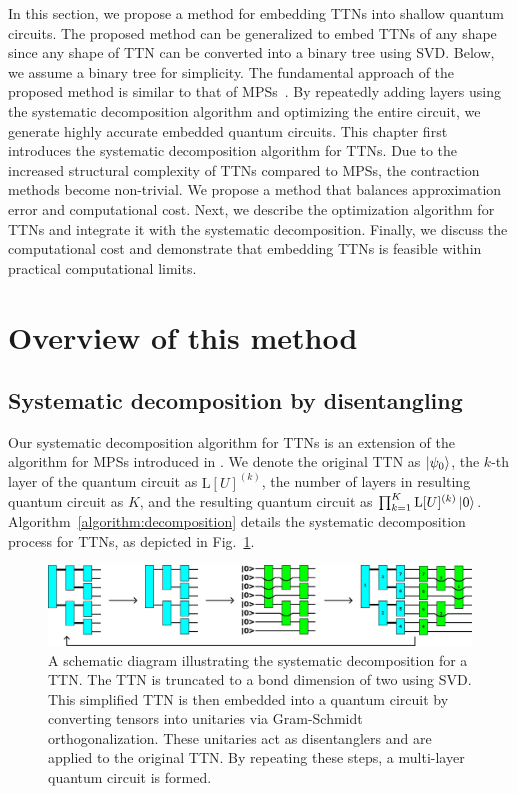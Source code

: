 \documentclass[12pt,dvipdfmx,twoside,openright]{report}
\begin{document}
In this section, we propose a method for embedding TTNs into shallow quantum circuits.
The proposed method can be generalized to embed TTNs of any shape since any shape of TTN can be converted into a binary tree using SVD.
Below, we assume a binary tree for simplicity.
The fundamental approach of the proposed method is similar to that of MPSs~\cite{mpsdecomp}. 
By repeatedly adding layers using the systematic decomposition algorithm and optimizing the entire circuit, we generate highly accurate embedded quantum circuits.
This chapter first introduces the systematic decomposition algorithm for TTNs.
Due to the increased structural complexity of TTNs compared to MPSs, the contraction methods become non-trivial. 
We propose a method that balances approximation error and computational cost.
Next, we describe the optimization algorithm for TTNs and integrate it with the systematic decomposition.
Finally, we discuss the computational cost and demonstrate that embedding TTNs is feasible within practical computational limits.

\section{Overview of this method}


\subsection{Systematic decomposition by disentangling}
Our systematic decomposition algorithm for TTNs is an extension of the algorithm for MPSs introduced in \cite{EncodingMPS}.
We denote the original TTN as $\ket{\psi_0}$, the $k$-th layer of the quantum circuit as $\mathrm{L}[U]^{(k)}$, the number of layers in resulting quantum circuit as $K$, and the resulting quantum circuit as $\prod_{k=1}^K \mathrm{L}[U]^{(k)}\ket{0}$.
Algorithm~\ref{algorithm:decomposition} details the systematic decomposition process for TTNs, as depicted in Fig.~\ref{fig:decomposition-a}.

\begin{figure}
    \centering
    \includegraphics[width=\linewidth]{fig-decomposition-a.pdf}
    \caption{A schematic diagram illustrating the systematic decomposition for a TTN.
    The TTN is truncated to a bond dimension of two using SVD. This simplified TTN is then embedded into a quantum circuit by converting tensors into unitaries via Gram-Schmidt orthogonalization. These unitaries act as disentanglers and are applied to the original TTN. By repeating these steps, a multi-layer quantum circuit is formed.
    }
    \label{fig:decomposition-a}
\end{figure}
\end{document}
